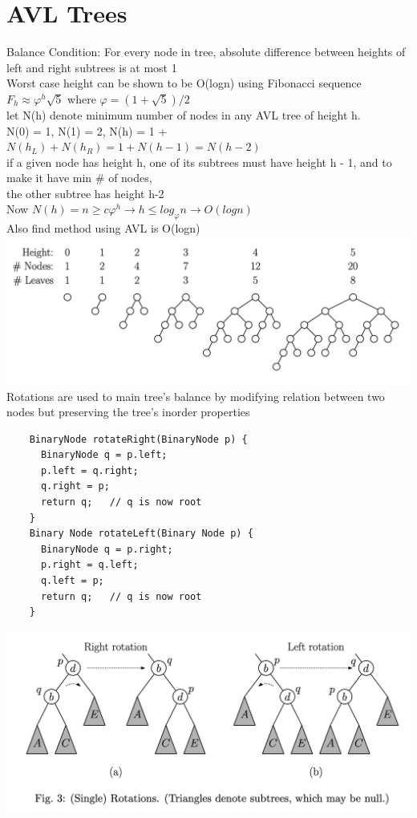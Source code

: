 \documentclass{article}
\begin{document}
  \section{AVL Trees}
  Balance Condition: For every node in tree, absolute difference between heights of left and right subtrees is at most 1 \\
  Worst case height can be shown to be O(logn) using Fibonacci sequence\\
  \indent $F_{h} \approx \varphi^{h}\sqrt{5}$ where $\varphi = (1 + \sqrt{5})/2$ \\
  \indent let N(h) denote minimum number of nodes in any AVL tree of height h. \\
  \indent \indent N(0) = 1, N(1) = 2, N(h) = 1 + $N(h_{L}) + N(h_{R}) = 1 + N(h-1) = N(h-2)$ \\
  \indent \indent \indent if a given node has height h, one of its subtrees must have height h - 1, and to make it have min \# of nodes, \\
  \indent \indent \indent the other subtree has height h-2\\
  \indent Now $N(h) = n \geq c \varphi^{h} \rightarrow h \leq log_{\varphi}n \rightarrow O(logn)$\\
  \indent Also find method using AVL is O(logn)\\
  \includegraphics[width=\textwidth]{FibTreeMinNodes}
  Rotations are used to main tree's balance by modifying relation between two nodes but preserving the tree's inorder properties 
  \begin{lstlisting}
    BinaryNode rotateRight(BinaryNode p) {
      BinaryNode q = p.left;
      p.left = q.right;
      q.right = p;
      return q;   // q is now root
    }
    Binary Node rotateLeft(Binary Node p) {
      BinaryNode q = p.right;
      p.right = q.left;
      q.left = p;
      return q;   // q is now root
    }
  \end{lstlisting}
  \includegraphics[width=\textwidth]{FibTreeRotation}
\end{document}
